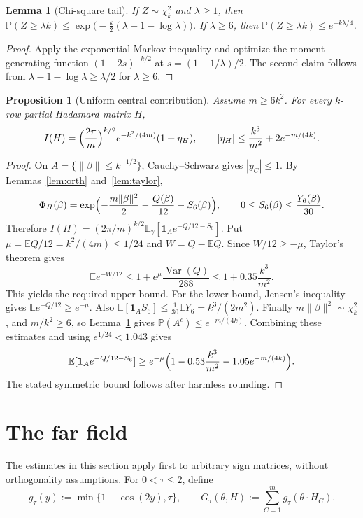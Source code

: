 \documentclass[11pt,reqno]{amsart}
\theoremstyle{plain}
\newtheorem{lemma}[theorem]{Lemma}
\newtheorem{proposition}[theorem]{Proposition}
\theoremstyle{definition}
\theoremstyle{remark}
\DeclareMathOperator{\Var}{Var}
\begin{document}
\begin{lemma}[Chi-square tail]\label{lem:chi2}
If \(Z\sim\chi^2_k\) and \(\lambda\ge1\), then
\(\mathbb P(Z\ge\lambda k)\le\exp\bigl(-\tfrac k2(\lambda-1-\log\lambda)\bigr)\).
If \(\lambda\ge6\), then \(\mathbb P(Z\ge\lambda k)\le e^{-k\lambda/4}\).
\end{lemma}

\begin{proof}
Apply the exponential Markov inequality and optimize the moment generating
function \((1-2s)^{-k/2}\) at \(s=(1-1/\lambda)/2\). The second claim follows
from \(\lambda-1-\log\lambda\ge\lambda/2\) for \(\lambda\ge6\).
\end{proof}

\begin{proposition}[Uniform central contribution]\label{prop:central}
Assume \(m\ge6k^2\). For every \(k\)-row partial Hadamard matrix \(H\),
\[
  I(H)=\Bigl(\frac{2\pi}m\Bigr)^{k/2}e^{-k^2/(4m)}(1+\eta_H),\qquad
  |\eta_H|\le\frac{k^3}{m^2}+2e^{-m/(4k)}.
\]
\end{proposition}

\begin{proof}
On \(A=\{\|\beta\|\le k^{-1/2}\}\), Cauchy--Schwarz gives \(|y_C|\le1\). By
Lemmas~\ref{lem:orth} and~\ref{lem:taylor},
\[
  \Phi_H(\beta)=\exp\Bigl(-\frac{m\|\beta\|^2}2-\frac{Q(\beta)}{12}
    -S_6(\beta)\Bigr),\qquad 0\le S_6(\beta)\le\frac{Y_6(\beta)}{30}.
\]
Therefore \(I(H)=(2\pi/m)^{k/2}\mathbb E_\gamma[\mathbf 1_Ae^{-Q/12-S_6}]\).
Put \(\mu=\mathbb EQ/12=k^2/(4m)\le1/24\) and \(W=Q-\mathbb EQ\). Since
\(W/12\ge-\mu\), Taylor's theorem gives
\[
  \mathbb Ee^{-W/12}\le1+e^\mu\frac{\Var(Q)}{288}\le1+0.35\frac{k^3}{m^2}.
\]
This yields the required upper bound. For the lower bound, Jensen's inequality
gives \(\mathbb Ee^{-Q/12}\ge e^{-\mu}\). Also
\(\mathbb E[\mathbf 1_AS_6]\le\tfrac1{30}\mathbb EY_6=k^3/(2m^2)\). Finally
\(m\|\beta\|^2\sim\chi^2_k\), and \(m/k^2\ge6\), so Lemma~\ref{lem:chi2} gives
\(\mathbb P(A^c)\le e^{-m/(4k)}\). Combining these estimates and using
\(e^{1/24}<1.043\) gives
\[
  \mathbb E[\mathbf 1_Ae^{-Q/12-S_6}]\ge e^{-\mu}
    \Bigl(1-0.53\frac{k^3}{m^2}-1.05e^{-m/(4k)}\Bigr).
\]
The stated symmetric bound follows after harmless rounding.
\end{proof}

\section{The far field}

The estimates in this section apply first to arbitrary sign matrices, without
orthogonality assumptions. For \(0<\tau\le2\), define
\[
  g_\tau(y):=\min\{1-\cos(2y),\tau\},\qquad
  G_\tau(\theta,H):=\sum_{C=1}^mg_\tau(\theta\cdot H_C).
\]
\end{document}
